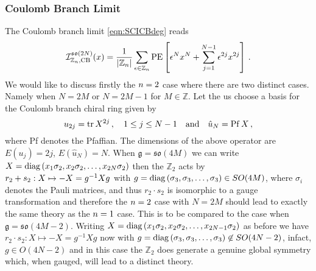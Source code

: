 \documentclass[main.tex]{subfiles}
\begin{document}
\subsubsection{Coulomb Branch Limit}
The Coulomb branch limit \eqref{eqn:SCICBdeg} reads
\begin{equation}
\mathcal{I}_{\mathbb{Z}_{n},\text{CB}}^{\mathfrak{so}(2N)}(x)=\frac{1}{|\mathbb{Z}_{n}|}\sum_{\epsilon\in\mathbb{Z}_{n}}\operatorname{\mathrm{PE}}\left[\epsilon^Nx^N+\sum_{j=1}^{N-1}\epsilon^{2j}x^{2j}\right]\,.
\end{equation}
We would like to discuss firstly the ${n}=2$ case where there are two distinct cases. Namely when $N=2M$ or $N=2M-1$ for $M\in\mathbb{Z}$. 
Let the us choose a basis for the Coulomb branch chiral ring given by 
\begin{equation}
u_{2j}=\operatorname{tr} X^{2j}\,,\quad 1\leq j\leq N-1\quad\text{and}\quad \hat{u}_N=\operatorname{Pf} X \, ,
\end{equation}
where Pf denotes the Pfaffian. The dimensions of the above operator are $E(u_j)=2j$, $E(\hat{u}_N)=N$. When $\mathfrak{g}=\mathfrak{so}(4M)$ we can write \\$X=\operatorname{diag}\left(x_1\sigma_2,x_2\sigma_2,\dots,x_{2N}\sigma_2\right)$ then the $\mathbb{Z}_2$ acts by $r_2+ s_2:X\mapsto-X=g^{-1}Xg$ with $g=\operatorname{diag}\left(\sigma_3,\sigma_3,\dots,\sigma_3\right)\in SO(4M)$, where $\sigma_i$ denotes the Pauli matrices, and thus $r_2\cdot s_2$ is isomorphic to a gauge transformation and therefore the ${n}=2$ case with $N=2M$ should lead to exactly the same theory as the ${n}=1$ case. 
This is to be compared to the case when $\mathfrak{g}=\mathfrak{so}(4M-2)$. Writing $X=\operatorname{diag}\left(x_1\sigma_2,x_2\sigma_2,\dots,x_{2N-1}\sigma_2\right)$ as before we have $r_2\cdot s_2:X\mapsto-X=g^{-1}Xg$ now with $g=\operatorname{diag}\left(\sigma_3,\sigma_3,\dots,\sigma_3\right)\not\in SO(4N-2)$, infact, $g\in O(4N-2)$ and in this case the $\mathbb{Z}_2$ does generate a genuine global symmetry which, when gauged, will lead to a distinct theory. 
\end{document}
